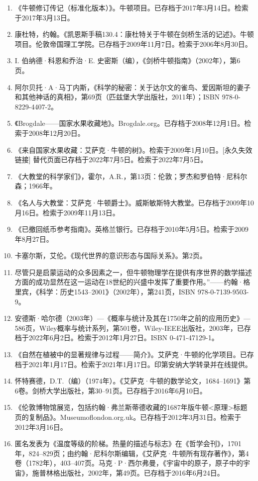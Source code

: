 \begin{enumerate}
\item 《牛顿修订传记（标准化版本）》。牛顿项目。已存档于2017年3月14日。检索于2017年3月13日。  
\item 康杜特，约翰。《凯恩斯手稿130.4：康杜特关于牛顿在剑桥生活的记述》。牛顿项目。伦敦帝国理工学院。已存档于2009年11月7日。检索于2006年8月30日。  
\item I. 伯纳德·科恩和乔治·E. 史密斯（编），《剑桥牛顿指南》（2002年），第6页。  
\item 阿尔贝托·A·马丁内斯，《科学的秘密：关于达尔文的雀鸟、爱因斯坦的妻子和其他神话的真相》，第69页（匹兹堡大学出版社，2011年）；ISBN 978-0-8229-4407-2。  
\item 《Brogdale——国家水果收藏地》。Brogdale.org。已存档于2008年12月1日。检索于2008年12月20日。
\item 《来自国家水果收藏：艾萨克·牛顿的树》。检索于2009年1月10日。[永久失效链接] 替代页面已存档于2022年7月5日。检索于2022年7月5日。  
\item 《大教堂的科学家们》，霍尔，A.R.，第13页：伦敦；罗杰和罗伯特·尼科尔森；1966年。  
\item 《名人与大教堂：艾萨克·牛顿爵士》。威斯敏斯特大教堂。已存档于2009年10月16日。检索于2009年11月13日。  
\item 《已撤回纸币参考指南》。英格兰银行。已存档于2010年5月5日。检索于2009年8月27日。  
\item 卡塞尔斯，艾伦。《现代世界的意识形态与国际关系》。第2页。  
\item 尽管只是启蒙运动的众多因素之一，但牛顿物理学在提供有序世界的数学描述方面的成功显然在这一运动在18世纪的兴盛中发挥了重要作用。”——约翰·格里宾，《科学：历史1543–2001》（2002年），第241页，ISBN 978-0-7139-9503-9。
\item 安德斯·哈尔德（2003年）—《概率与统计及其在1750年之前的应用历史》—586页，Wiley概率与统计系列，第501卷，Wiley-IEEE出版社，2003年，已存档于2022年6月2日。检索于2012年1月27日。ISBN 0-471-47129-1。  
\item 《自然在植被中的显著规律与过程——简介》。艾萨克·牛顿的化学项目。已存档于2021年1月17日。检索于2021年1月17日。印第安纳大学转录并在线提供。  
\item 怀特赛德，D.T.（编）（1974年）。《艾萨克·牛顿的数学论文，1684–1691》第6卷。剑桥大学出版社，第30–91页。已存档于2016年6月10日。  
\item 《伦敦博物馆展览，包括约翰·弗兰斯蒂德收藏的1687年版牛顿<原理>标题页的复制品》。Museumoflondon.org.uk。已存档于2012年3月31日。检索于2012年3月16日。
\item 匿名发表为《温度等级的阶梯。热量的描述与标志》在《哲学会刊》，1701年，824–829页；由约翰·尼科尔斯编辑，《艾萨克·牛顿所有现存著作》，第4卷（1782年），403–407页。马克·P·西尔弗曼，《宇宙中的原子，原子中的宇宙》，施普林格出版社，2002年，第49页。已存档于2016年6月24日。  

\end{enumerate}
